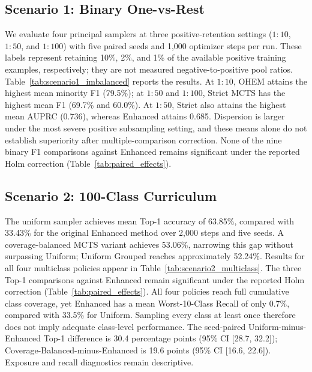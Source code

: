 \documentclass[11pt]{article}
\begin{document}
\subsection{Scenario 1: Binary One-vs-Rest}
We evaluate four principal samplers at three positive-retention settings
($1{:}10$, $1{:}50$, and $1{:}100$) with five paired seeds and 1,000
optimizer steps per run. These labels represent retaining 10\%, 2\%,
and 1\% of the available positive training examples, respectively; they
are not measured negative-to-positive pool ratios.
Table~\ref{tab:scenario1_imbalanced} reports the results. At
$1{:}10$, OHEM attains the highest mean minority F1 (79.5\%); at
$1{:}50$ and $1{:}100$, Strict MCTS has the highest mean F1 (69.7\%
and 60.0\%). At $1{:}50$, Strict also attains the highest mean AUPRC
(0.736), whereas Enhanced attains 0.685. Dispersion is larger under the
most severe positive subsampling setting, and these means alone do not
establish superiority after multiple-comparison correction. None of the nine binary F1 comparisons against Enhanced remains significant under the reported Holm correction (Table~\ref{tab:paired_effects}).



\subsection{Scenario 2: 100-Class Curriculum}
The uniform sampler achieves mean Top-1 accuracy of 63.85\%, compared with
33.43\% for the original Enhanced method over 2,000 steps and five seeds.
A coverage-balanced MCTS variant achieves 53.06\%, narrowing this
gap without surpassing Uniform; Uniform Grouped reaches approximately 52.24\%.
Results for all four multiclass policies appear in Table~\ref{tab:scenario2_multiclass}. The three Top-1 comparisons against Enhanced remain significant under the reported Holm correction (Table~\ref{tab:paired_effects}). All four policies reach full cumulative class coverage, yet Enhanced has a mean Worst-10-Class Recall of only 0.7\%, compared with 33.5\% for Uniform. Sampling every class at least once therefore does not imply adequate class-level performance. The seed-paired Uniform-minus-Enhanced Top-1 difference is 30.4 percentage points (95\% CI [28.7, 32.2]); Coverage-Balanced-minus-Enhanced is 19.6 points (95\% CI [16.6, 22.6]). Exposure and recall diagnostics remain descriptive.


\end{document}
